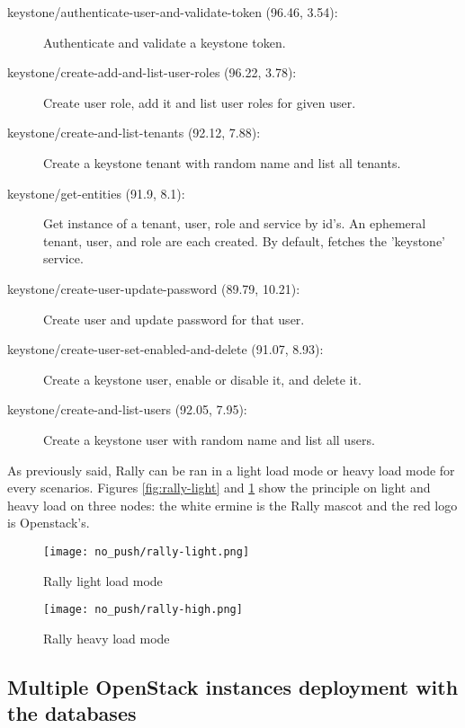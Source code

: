 \begin{description}
    \item[keystone/authenticate-user-and-validate-token (96.46, 3.54):] Authenticate and validate a keystone token.
    \item[keystone/create-add-and-list-user-roles (96.22, 3.78):] Create user role, add it and list user roles for given user.
    \item[keystone/create-and-list-tenants (92.12, 7.88):] Create a keystone tenant with random name and list all tenants.
    \item[keystone/get-entities (91.9, 8.1):] Get instance of a tenant, user, role and service by id’s. An ephemeral tenant, user, and role are each created. By default, fetches the ’keystone’ service.
    \item[keystone/create-user-update-password (89.79, 10.21):] Create user and update password for that user.
    \item[keystone/create-user-set-enabled-and-delete (91.07, 8.93):] Create a keystone user, enable or disable it, and delete it.
    \item[keystone/create-and-list-users (92.05, 7.95):] Create a keystone user with random name and list all users.
\end{description}

As previously said, Rally can be ran in a light load mode or heavy load mode for every scenarios. Figures \ref{fig:rally-light} and \ref{fig:rally-high} show the principle on light and heavy load on three nodes: the white ermine is the Rally mascot and the red logo is Openstack's.


\begin{figure}[!h]\centering
  \begin {minipage}{0.3\textwidth}                        \centerline{\texttt{[image: no\_push/rally-light.png]}}
    \vspace{-20pt}
    \caption{Rally light load mode}
    \label{fig:rally-light}
  \end{minipage}
  \begin{minipage}{0.3\textwidth}                   \centerline{\texttt{[image: no\_push/rally-high.png]}}
    \vspace{-10pt}
    \caption{Rally heavy load mode}
    \label{fig:rally-high}
  \end{minipage}
\end{figure}

\subsection{Multiple OpenStack instances deployment with the databases}


